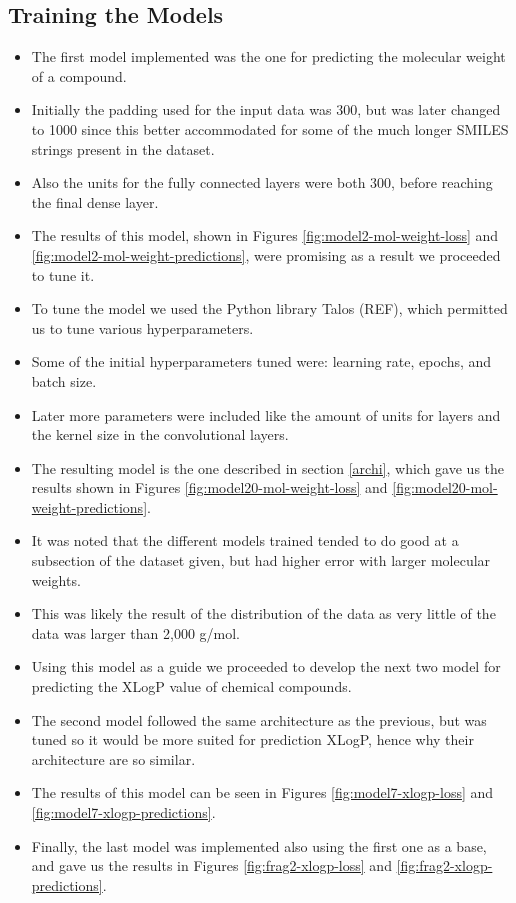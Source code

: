     \subsection{Training the Models}
    \begin{itemize}
        \item The first model implemented was the one for predicting the molecular weight of a compound.
        \item Initially the padding used for the input data was 300, but was later changed to 1000 since this better accommodated for some of the much longer SMILES strings present in the dataset.
        \item Also the units for the fully connected layers were both 300, before reaching the final dense layer. 
        \item The results of this model, shown in Figures \ref{fig:model2-mol-weight-loss} and \ref{fig:model2-mol-weight-predictions}, were promising as a result we proceeded to tune it.
        \item To tune the model we used the Python library Talos (REF), which permitted us to tune various hyperparameters.
        \item Some of the initial hyperparameters tuned were: learning rate, epochs, and batch size. \item Later more parameters were included like the amount of units for layers and the kernel size in the convolutional layers.
        \item The resulting model is the one described in section \ref{archi}, which gave us the results shown in Figures \ref{fig:model20-mol-weight-loss} and \ref{fig:model20-mol-weight-predictions}.
        \item It was noted that the different models trained tended to do good at a subsection of the dataset given, but had higher error with larger molecular weights.
        \item This was likely the result of the distribution of the data as very little of the data was larger than 2,000 g/mol.
        \item Using this model as a guide we proceeded to develop the next two model for predicting the XLogP value of chemical compounds.
        \item The second model followed the same architecture as the previous, but was tuned so it would be more suited for prediction XLogP, hence why their architecture are so similar.
        \item The results of this model can be seen in Figures \ref{fig:model7-xlogp-loss} and \ref{fig:model7-xlogp-predictions}.
        \item Finally, the last model was implemented also using the first one as a base, and gave us the results in Figures \ref{fig:frag2-xlogp-loss} and \ref{fig:frag2-xlogp-predictions}.
    \end{itemize}
    
